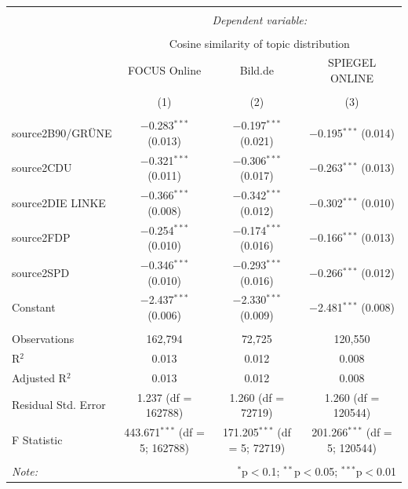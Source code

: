 \documentclass[
]{article}
\begin{document}
\begin{table}[!htbp] \centering 
  \caption{} 
  \label{} 
\tiny 
\begin{tabular}{@{\extracolsep{5pt}}lccc} 
\\[-1.8ex]\hline 
\hline \\[-1.8ex] 
 & \multicolumn{3}{c}{\textit{Dependent variable:}} \\ 
\cline{2-4} 
\\[-1.8ex] & \multicolumn{3}{c}{Cosine similarity of topic distribution} \\ 
 & FOCUS Online & Bild.de & SPIEGEL ONLINE \\ 
\\[-1.8ex] & (1) & (2) & (3)\\ 
\hline \\[-1.8ex] 
 source2B90/GRÜNE & $-$0.283$^{***}$ (0.013) & $-$0.197$^{***}$ (0.021) & $-$0.195$^{***}$ (0.014) \\ 
  source2CDU & $-$0.321$^{***}$ (0.011) & $-$0.306$^{***}$ (0.017) & $-$0.263$^{***}$ (0.013) \\ 
  source2DIE LINKE & $-$0.366$^{***}$ (0.008) & $-$0.342$^{***}$ (0.012) & $-$0.302$^{***}$ (0.010) \\ 
  source2FDP & $-$0.254$^{***}$ (0.010) & $-$0.174$^{***}$ (0.016) & $-$0.166$^{***}$ (0.013) \\ 
  source2SPD & $-$0.346$^{***}$ (0.010) & $-$0.293$^{***}$ (0.016) & $-$0.266$^{***}$ (0.012) \\ 
  Constant & $-$2.437$^{***}$ (0.006) & $-$2.330$^{***}$ (0.009) & $-$2.481$^{***}$ (0.008) \\ 
 \hline \\[-1.8ex] 
Observations & 162,794 & 72,725 & 120,550 \\ 
R$^{2}$ & 0.013 & 0.012 & 0.008 \\ 
Adjusted R$^{2}$ & 0.013 & 0.012 & 0.008 \\ 
Residual Std. Error & 1.237 (df = 162788) & 1.260 (df = 72719) & 1.260 (df = 120544) \\ 
F Statistic & 443.671$^{***}$ (df = 5; 162788) & 171.205$^{***}$ (df = 5; 72719) & 201.266$^{***}$ (df = 5; 120544) \\ 
\hline 
\hline \\[-1.8ex] 
\textit{Note:}  & \multicolumn{3}{r}{$^{*}$p$<$0.1; $^{**}$p$<$0.05; $^{***}$p$<$0.01} \\ 
\end{tabular} 
\end{table}
\end{document}
